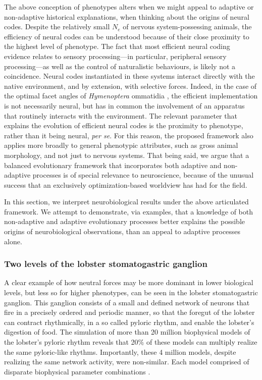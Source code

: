 \documentclass[twocolumn]{article}
\begin{document}
The above conception of phenotypes alters when we might appeal to adaptive or non-adaptive historical explanations, when thinking about the origins of neural codes. Despite the relatively small $N_e$ of nervous system-possessing animals, the efficiency of neural codes can be understood because of their close proximity to the highest level of phenotype. The fact that most efficient neural coding evidence relates to sensory processing---in particular, peripheral sensory processing---as well as the control of naturalistic behaviours, is likely not a coincidence. Neural codes instantiated in these systems interact directly with the native environment, and by extension, with selective forces. Indeed, in the case of the optimal facet angles of \textit{Hymenoptera} ommatidia \cite{barlow_1952}, the efficient implementation is not necessarily neural, but has in common the involvement of an apparatus that routinely interacts with the environment. The relevant parameter that explains the evolution of efficient neural codes is the proximity to phenotype, rather than it being neural, \textit{per se}. For this reason, the proposed framework also applies more broadly to general phenotypic attributes, such as gross animal morphology, and not just to nervous systems. That being said, we argue that a balanced evolutionary framework that incorporates both adaptive and non-adaptive processes is of special relevance to neuroscience, because of the unusual success that an exclusively optimization-based worldview has had for the field.

In this section, we interpret neurobiological results under the above articulated framework. We attempt to demonstrate, via examples, that a knowledge of both non-adaptive and adaptive evolutionary processes better explains the possible origins of neurobiological observations, than an appeal to adaptive processes alone. 

\subsubsection{Two levels of the lobster stomatogastric ganglion}

A clear example of how neutral forces may be more dominant in lower biological levels, but less so for higher phenotypes, can be seen in the lobster stomatogastric ganglion. This ganglion consists of a small and defined network of neurons that fire in a precisely ordered and periodic manner, so that the foregut of the lobster can contract rhythmically, in a so called pyloric rhythm, and enable the lobster's digestion of food. The simulation of more than 20 million biophysical models of the lobster's pyloric rhythm reveals that 20\% of these models can multiply realize the same pyloric-like rhythms. Importantly, these 4 million models, despite realizing the same network activity, were non-similar. Each model comprised of disparate biophysical parameter combinations \cite{prinz_marder_2004}.
\end{document}
